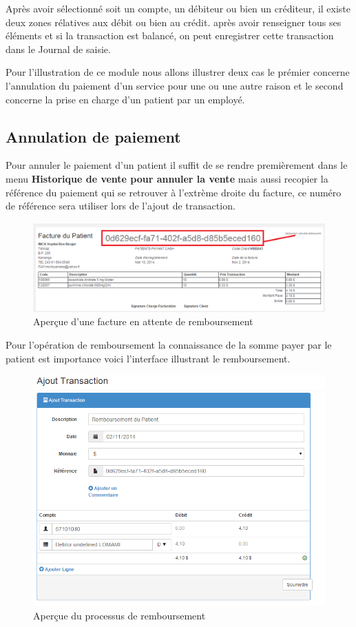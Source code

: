 \documentclass[12pt,a4paper]{report}
\begin{document}
Après avoir sélectionné soit un compte, un débiteur ou bien un créditeur, il existe deux zones rélatives aux débit ou bien au crédit. après avoir renseigner tous ses éléments et si la transaction est balancé, on peut enregistrer cette transaction dans le Journal de saisie.

Pour l'illustration de ce module nous allons illustrer deux cas le prémier concerne l'annulation du paiement d'un service pour une ou une autre raison et le second concerne la prise en charge d'un patient par un employé.

\subsection{Annulation de paiement}
Pour annuler le paiement d'un patient il suffit de se rendre premièrement dans le menu \textbf{Historique de vente pour annuler la vente} mais aussi recopier la référence du paiement qui se retrouver à l'extrème droite du facture, ce numéro de référence sera utiliser lors de l'ajout de transaction.

\begin{figure}[h]
\begin{center}
\includegraphics[width=12cm]{pic/RefDocument.png}
\end{center}
\caption{Aperçue d'une facture en attente de remboursement}
\label{Aperçue d'une facture en attente de remboursement}
\end{figure}
\newpage
Pour l'opération de remboursement la connaissance de la somme payer par le patient est importance voici l'interface illustrant le remboursement.

\begin{figure}[h]
\begin{center}
\includegraphics[width=12cm]{pic/AjouTrans.png}
\end{center}
\caption{Aperçue du processus de remboursement}
\label{Aperçue du processus de remboursement}
\end{figure}
\end{document}
